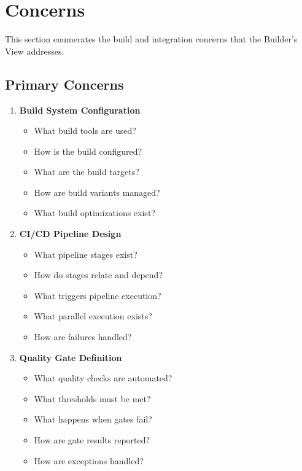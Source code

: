 \documentclass[11pt,letterpaper]{article}
\begin{document}
\section{Concerns}

This section enumerates the build and integration concerns that the Builder's View addresses.

\subsection{Primary Concerns}

\begin{enumerate}[label=\textbf{C\arabic*:}, leftmargin=2.5em]
    \item \textbf{Build System Configuration}
    \begin{itemize}[nosep]
        \item What build tools are used?
        \item How is the build configured?
        \item What are the build targets?
        \item How are build variants managed?
        \item What build optimizations exist?
    \end{itemize}
    
    \item \textbf{CI/CD Pipeline Design}
    \begin{itemize}[nosep]
        \item What pipeline stages exist?
        \item How do stages relate and depend?
        \item What triggers pipeline execution?
        \item What parallel execution exists?
        \item How are failures handled?
    \end{itemize}
    
    \item \textbf{Quality Gate Definition}
    \begin{itemize}[nosep]
        \item What quality checks are automated?
        \item What thresholds must be met?
        \item What happens when gates fail?
        \item How are gate results reported?
        \item How are exceptions handled?
    \end{itemize}
    

\end{enumerate}
\end{document}
